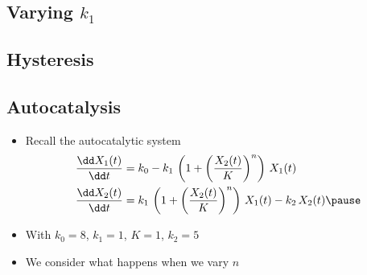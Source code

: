 \begin{slide}
\section{Varying $k_1$}

\pause
\pb {}
\begin{center}
  \pause
\end{center}
\end{slide}


\begin{slide}
\section[-1]{Hysteresis}

\pause
\pb {}
\begin{center}
  \pause
\end{center}
\end{slide}


\begin{slide}
\section{Autocatalysis}

\begin{PauseHighLight}
  \begin{itemize}
  \item Recall the autocatalytic system
    \begin{align*}
    \frac{\dd X_1(t)}{\dd t} &= k_0 -
       k_1\,\left(1+\left(\frac{X_2(t)}{K}\right)^n\right)\,X_1(t) \\
    \frac{\dd X_2(t)}{\dd t} &=
       k_1\,\left(1+\left(\frac{X_2(t)}{K}\right)^n\right)\,X_1(t) -k_2\,X_2(t)\pause
    \end{align*}
  \item With $k_0=8$, $k_1=1$, $K=1$, $k_2=5$\pause
  \item We consider what happens when we vary $n$\pause

  \end{itemize}
\end{PauseHighLight}

\end{slide}

